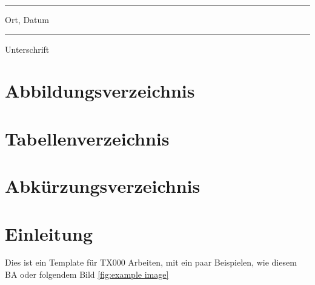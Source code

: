 \documentclass[12pt]{report}
\begin{document}
\vspace{2.5cm}

\parbox{6.5cm}{\hrule\medskip Ort, Datum}  \hfill \parbox{6.5cm}{\hrule\medskip Unterschrift} \hspace{3cm}


\newpage
\chapter*{Abbildungsverzeichnis}

\listoffigures




\newpage
\chapter*{Tabellenverzeichnis}

\listoftables


\newpage
\chapter*{Abkürzungsverzeichnis}

\begin{acronym}[SOAP]
\end{acronym}


\addtocounter{frontmatterPage}{\value{page}} 

\newpage
{}
\chapter{Einleitung}

Dies ist ein Template für TX000 Arbeiten, mit ein paar Beispielen, wie diesem \ac{BA} oder folgendem Bild \ref{fig:example image}
\end{document}
